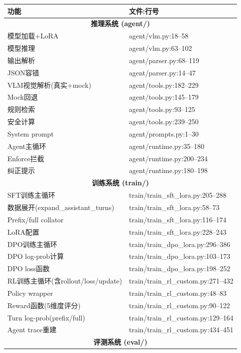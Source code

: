\documentclass[fontset=none,11pt,a4paper]{ctexart}
\begin{document}
{\small
\begin{longtable}{lp{7cm}}
\toprule
功能 & 文件:行号 \\
\midrule
\multicolumn{2}{c}{\textbf{推理系统 (agent/)}} \\
模型加载+LoRA & agent/vlm.py:18--58 \\
模型推理 & agent/vlm.py:63--102 \\
输出解析 & agent/parser.py:68--119 \\
JSON容错 & agent/parser.py:14--47 \\
VLM视觉解析(真实+mock) & agent/tools.py:182--229 \\
Mock回退 & agent/tools.py:145--179 \\
规则检索 & agent/tools.py:93--125 \\
安全计算 & agent/tools.py:239--250 \\
System prompt & agent/prompts.py:1--30 \\
Agent主循环 & agent/runtime.py:35--180 \\
Enforce拦截 & agent/runtime.py:200--234 \\
纠正提示 & agent/runtime.py:180--198 \\
\midrule
\multicolumn{2}{c}{\textbf{训练系统 (train/)}} \\
SFT训练主循环 & train/train\_sft\_lora.py:205--288 \\
数据展开(expand\_assistant\_turns) & train/train\_sft\_lora.py:58--73 \\
Prefix/full collator & train/train\_sft\_lora.py:116--174 \\
LoRA配置 & train/train\_sft\_lora.py:228--243 \\
DPO训练主循环 & train/train\_dpo\_lora.py:296--386 \\
DPO log-prob计算 & train/train\_dpo\_lora.py:103--173 \\
DPO loss函数 & train/train\_dpo\_lora.py:198--252 \\
\hline
RL训练主循环(含rollout/loss/update) & train/train\_rl\_custom.py:271--432 \\
Policy wrapper & train/train\_rl\_custom.py:48--83 \\
Reward函数(5维度评分) & train/train\_rl\_custom.py:90--122 \\
Turn log-prob(prefix/full) & train/train\_rl\_custom.py:129--164 \\
Agent trace重建 & train/train\_rl\_custom.py:434--451 \\
\midrule
\multicolumn{2}{c}{\textbf{评测系统 (eval/)}} \\

\end{longtable}}
\end{document}
